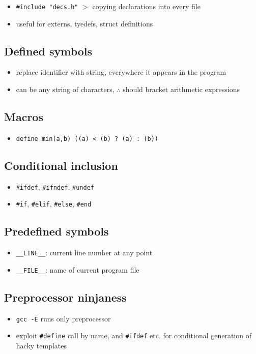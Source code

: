 \documentclass[10pt, multicolumn, a4paper]{article}
\begin{document}
\begin{multicols}{2}
	\begin{itemize}
	\item \verb|#include "decs.h"| $>$ copying declarations into every file
	\item useful for externs, tyedefs, struct definitions
	\end{itemize}
	\subsection*{Defined symbols}
	\begin{itemize}
	\item replace identifier with string, everywhere it appears in the program
	\item can be any string of characters, $\therefore$ should bracket arithmetic expressions
	\end{itemize}
	\subsection*{Macros}
	\begin{itemize}
	\item \verb|define min(a,b) ((a) < (b) ? (a) : (b))|
	\end{itemize}
	\subsection*{Conditional inclusion}
	\begin{itemize}
	\item \verb|#ifdef|, \verb|#ifndef|, \verb|#undef|
	\item \verb|#if|, \verb|#elif|, \verb|#else|, \verb|#end|
	\end{itemize}
	\subsection*{Predefined symbols}
	\begin{itemize}
	\item \verb|__LINE__|: current line number at any point
	\item \verb|__FILE__|: name of current program file
	\end{itemize}
	\subsection*{Preprocessor ninjaness}
	\begin{itemize}
	\item \verb|gcc -E| runs only preprocessor
	\item exploit \verb|#define| call by name, and \verb|#ifdef| etc. for conditional generation of hacky templates
	\end{itemize}
	
\end{multicols}
\end{document}
